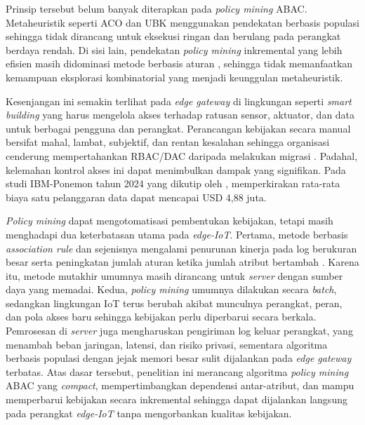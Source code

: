 Prinsip tersebut belum banyak diterapkan pada \textit{policy mining} ABAC.
Metaheuristik seperti ACO dan UBK menggunakan pendekatan berbasis populasi sehingga tidak dirancang untuk eksekusi ringan dan berulang pada perangkat berdaya rendah.
Di sisi lain, pendekatan \textit{policy mining} inkremental yang lebih efisien masih didominasi metode berbasis aturan \parencite{batra_incremental_2021,bamberger_automated_2024}, sehingga tidak memanfaatkan kemampuan eksplorasi kombinatorial yang menjadi keunggulan metaheuristik.

Kesenjangan ini semakin terlihat pada \textit{edge gateway} di lingkungan seperti \textit{smart building} yang harus mengelola akses terhadap ratusan sensor, aktuator, dan data untuk berbagai pengguna dan perangkat.
Perancangan kebijakan secara manual bersifat mahal, lambat, subjektif, dan rentan kesalahan sehingga organisasi cenderung mempertahankan RBAC/DAC daripada melakukan migrasi \parencite{diaz-rodriguez_abac_2025}.
Padahal, kelemahan kontrol akses ini dapat menimbulkan dampak yang signifikan.
Pada studi IBM-Ponemon tahun 2024 yang dikutip oleh \textcite{diaz-rodriguez_abac_2025}, memperkirakan rata-rata biaya satu pelanggaran data dapat mencapai USD 4,88 juta.

\textit{Policy mining} dapat mengotomatisasi pembentukan kebijakan, tetapi masih menghadapi dua keterbatasan utama pada \textit{edge-IoT}.
Pertama, metode berbasis \textit{association rule} dan sejenisnya mengalami penurunan kinerja pada log berukuran besar serta peningkatan jumlah aturan ketika jumlah atribut bertambah \parencite{xu_mining_2015,inproceedings}.
Karena itu, metode mutakhir umumnya masih dirancang untuk \textit{server} dengan sumber daya yang memadai.
Kedua, \textit{policy mining} umumnya dilakukan secara \textit{batch}, sedangkan lingkungan IoT terus berubah akibat munculnya perangkat, peran, dan pola akses baru sehingga kebijakan perlu diperbarui secara berkala.
Pemrosesan di \textit{server} juga mengharuskan pengiriman log keluar perangkat, yang menambah beban jaringan, latensi, dan risiko privasi, sementara algoritma berbasis populasi dengan jejak memori besar sulit dijalankan pada \textit{edge gateway} terbatas.
Atas dasar tersebut, penelitian ini merancang algoritma \textit{policy mining} ABAC yang \textit{compact}, mempertimbangkan dependensi antar-atribut, dan mampu memperbarui kebijakan secara inkremental sehingga dapat dijalankan langsung pada perangkat \textit{edge-IoT} tanpa mengorbankan kualitas kebijakan.